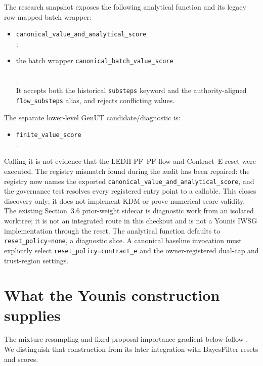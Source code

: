 \documentclass[11pt]{article}
\begin{document}
The research snapshot exposes the following analytical function and
its legacy row-mapped batch wrapper:
\begin{itemize}[leftmargin=2em]
  \item \texttt{canonical\_value\_and\_analytical\_score}\\
        ;
  \item the batch wrapper
        \texttt{canonical\_batch\_value\_score}\\
        \\
        .\\
        It accepts both the historical \texttt{substeps} keyword and the
        authority-aligned \texttt{flow\_substeps} alias, and rejects
        conflicting values.
\end{itemize}
The separate lower-level GenUT candidate/diagnostic is:
\begin{itemize}[leftmargin=2em]
  \item \texttt{finite\_value\_score}\\
        .
\end{itemize}
Calling it is not evidence that the LEDH PF--PF flow and Contract--E reset
were executed.  The registry mismatch found during the audit has been repaired:
the registry now names the exported
\texttt{canonical\_value\_and\_analytical\_score}, and the governance test
resolves every registered entry point to a callable.  This closes discovery
only; it does not implement KDM or prove numerical score validity.  The existing
Section~3.6 prior-weight sidecar is diagnostic work from an isolated worktree;
it is not an integrated route in this checkout and is not a Younis IWSG
implementation through the reset.  The analytical function defaults to
\texttt{reset\_policy=none}, a diagnostic slice.  A canonical baseline
invocation must explicitly select \texttt{reset\_policy=contract\_e} and the
owner-registered dual-cap and trust-region settings.

\section{What the Younis construction supplies}
\label{sec:younis}

The mixture resampling and fixed-proposal importance gradient below follow
\citet[Section~4, equations (14)--(15)]{younis2023}. We distinguish that
construction from its later integration with BayesFilter resets and scores.
\end{document}
